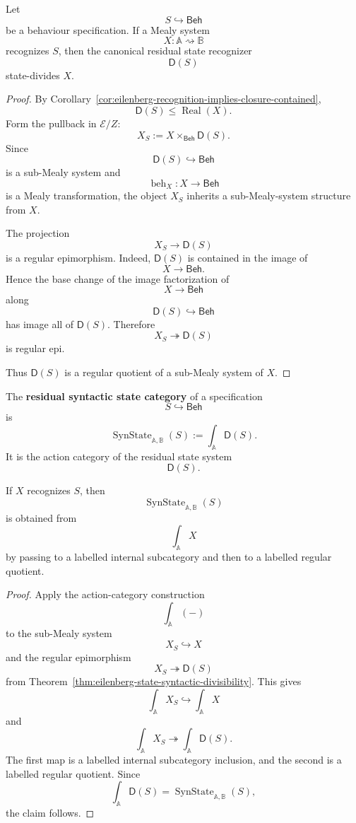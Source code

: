 \begin{theorem}
\label{thm:eilenberg-state-syntactic-divisibility}
Let
\[
S\hookrightarrow\mathsf{Beh}
\]
be a behaviour specification. If a Mealy system
\[
X:\mathbb A\rightsquigarrow\mathbb B
\]
recognizes \(S\), then the canonical residual state recognizer
\[
\mathsf D(S)
\]
state-divides \(X\).
\end{theorem}

\begin{proof}
By Corollary~\ref{cor:eilenberg-recognition-implies-closure-contained},
\[
\mathsf D(S)\leq\operatorname{Real}(X).
\]
Form the pullback in \(\mathcal E/Z\):
\[
X_S
:=
X\times_{\mathsf{Beh}}\mathsf D(S).
\]
Since
\[
\mathsf D(S)\hookrightarrow\mathsf{Beh}
\]
is a sub-Mealy system and
\[
\operatorname{beh}_X:X\to\mathsf{Beh}
\]
is a Mealy transformation, the object \(X_S\) inherits a sub-Mealy-system
structure from \(X\).

The projection
\[
X_S\to\mathsf D(S)
\]
is a regular epimorphism. Indeed, \(\mathsf D(S)\) is contained in the image
of
\[
X\to\mathsf{Beh}.
\]
Hence the base change of the image factorization of
\[
X\to\mathsf{Beh}
\]
along
\[
\mathsf D(S)\hookrightarrow\mathsf{Beh}
\]
has image all of \(\mathsf D(S)\). Therefore
\[
X_S\twoheadrightarrow\mathsf D(S)
\]
is regular epi.

Thus \(\mathsf D(S)\) is a regular quotient of a sub-Mealy system of \(X\).
\end{proof}

\begin{definition}
\label{def:eilenberg-synstate}
The \textbf{residual syntactic state category} of a specification
\[
S\hookrightarrow\mathsf{Beh}
\]
is
\[
\operatorname{SynState}_{\mathbb A,\mathbb B}(S)
:=
\int_{\mathbb A}\mathsf D(S).
\]
It is the action category of the residual state system
\[
\mathsf D(S).
\]
\end{definition}

\begin{corollary}
\label{cor:eilenberg-labelled-state-divisibility}
If \(X\) recognizes \(S\), then
\[
\operatorname{SynState}_{\mathbb A,\mathbb B}(S)
\]
is obtained from
\[
\int_{\mathbb A}X
\]
by passing to a labelled internal subcategory and then to a labelled regular
quotient.
\end{corollary}

\begin{proof}
Apply the action-category construction
\[
\int_{\mathbb A}(-)
\]
to the sub-Mealy system
\[
X_S\hookrightarrow X
\]
and the regular epimorphism
\[
X_S\twoheadrightarrow\mathsf D(S)
\]
from Theorem~\ref{thm:eilenberg-state-syntactic-divisibility}. This gives
\[
\int_{\mathbb A}X_S
\hookrightarrow
\int_{\mathbb A}X
\]
and
\[
\int_{\mathbb A}X_S
\twoheadrightarrow
\int_{\mathbb A}\mathsf D(S).
\]
The first map is a labelled internal subcategory inclusion, and the second is
a labelled regular quotient. Since
\[
\int_{\mathbb A}\mathsf D(S)
=
\operatorname{SynState}_{\mathbb A,\mathbb B}(S),
\]
the claim follows.
\end{proof}

